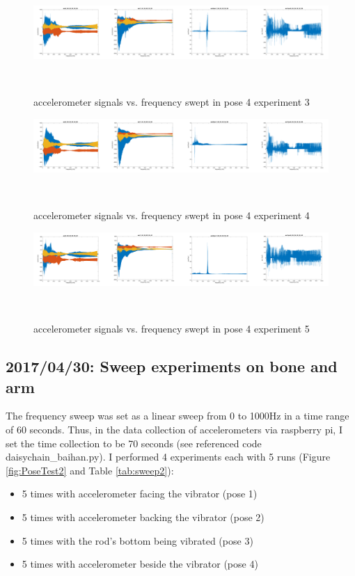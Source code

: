 \documentclass{sigchi}
\begin{document}
\begin{figure}
  \centering
  \includegraphics[width=1.95\columnwidth]{figures/pose4_3}
  \caption{accelerometer signals vs. frequency swept in pose 4 experiment 3}
    ~\label{fig:pose4_3}
\end{figure}

\begin{figure}
  \centering
  \includegraphics[width=1.95\columnwidth]{figures/pose4_4}
  \caption{accelerometer signals vs. frequency swept in pose 4 experiment 4}
    ~\label{fig:pose4_4}
\end{figure}

\begin{figure}
  \centering
  \includegraphics[width=1.95\columnwidth]{figures/pose4_5}
  \caption{accelerometer signals vs. frequency swept in pose 4 experiment 5}
    ~\label{fig:pose4_5}
\end{figure}

\subsection{2017/04/30: Sweep experiments on bone and arm} 

The frequency sweep was set as a linear sweep from 0 to 1000Hz in a time range of 60 seconds. Thus, in the data collection of accelerometers via raspberry pi, I set the time collection to be 70 seconds (see referenced code daisychain\_baihan.py). I performed 4 experiments each with 5 runs (Figure \ref{fig:PoseTest2} and Table \ref{tab:sweep2}): 
\begin{itemize}
\item 5 times with accelerometer facing the vibrator (pose 1)
\item 5 times with accelerometer backing the vibrator (pose 2)
\item 5 times with the rod's bottom being vibrated (pose 3)
\item 5 times with accelerometer beside the vibrator (pose 4)
\end{itemize}
\end{document}
